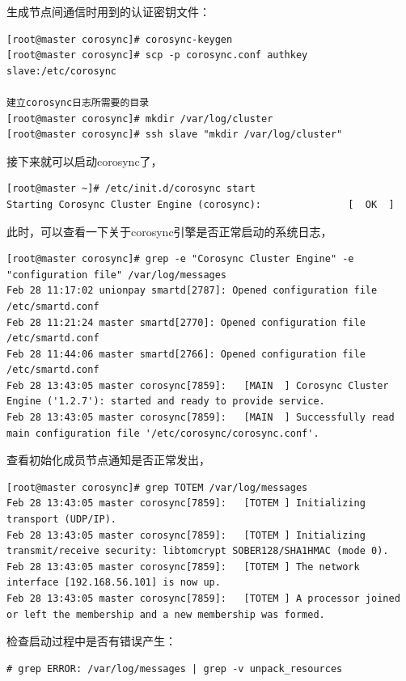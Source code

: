 生成节点间通信时用到的认证密钥文件：

\begin{verbatim}
[root@master corosync]# corosync-keygen
[root@master corosync]# scp -p corosync.conf authkey slave:/etc/corosync

建立corosync日志所需要的目录
[root@master corosync]# mkdir /var/log/cluster
[root@master corosync]# ssh slave "mkdir /var/log/cluster"
\end{verbatim}

接下来就可以启动corosync了，

\begin{verbatim}
[root@master ~]# /etc/init.d/corosync start
Starting Corosync Cluster Engine (corosync):               [  OK  ]
\end{verbatim}

此时，可以查看一下关于corosync引擎是否正常启动的系统日志，

\begin{verbatim}
[root@master corosync]# grep -e "Corosync Cluster Engine" -e "configuration file" /var/log/messages
Feb 28 11:17:02 unionpay smartd[2787]: Opened configuration file /etc/smartd.conf 
Feb 28 11:21:24 master smartd[2770]: Opened configuration file /etc/smartd.conf 
Feb 28 11:44:06 master smartd[2766]: Opened configuration file /etc/smartd.conf 
Feb 28 13:43:05 master corosync[7859]:   [MAIN  ] Corosync Cluster Engine ('1.2.7'): started and ready to provide service.
Feb 28 13:43:05 master corosync[7859]:   [MAIN  ] Successfully read main configuration file '/etc/corosync/corosync.conf'.
\end{verbatim}

查看初始化成员节点通知是否正常发出，
\begin{verbatim}
[root@master corosync]# grep TOTEM /var/log/messages
Feb 28 13:43:05 master corosync[7859]:   [TOTEM ] Initializing transport (UDP/IP).
Feb 28 13:43:05 master corosync[7859]:   [TOTEM ] Initializing transmit/receive security: libtomcrypt SOBER128/SHA1HMAC (mode 0).
Feb 28 13:43:05 master corosync[7859]:   [TOTEM ] The network interface [192.168.56.101] is now up.
Feb 28 13:43:05 master corosync[7859]:   [TOTEM ] A processor joined or left the membership and a new membership was formed.
\end{verbatim}

检查启动过程中是否有错误产生：
\begin{verbatim}
# grep ERROR: /var/log/messages | grep -v unpack_resources
\end{verbatim}

